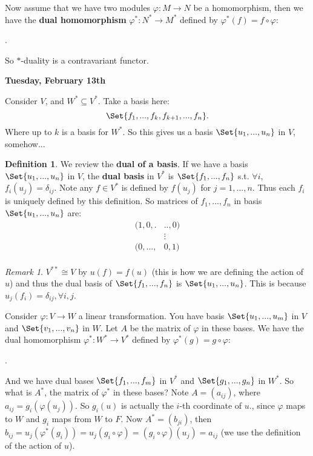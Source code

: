 \documentclass[9pt,reqno,twoside]{amsbook}
\theoremstyle{plain}
\numberwithin{section}{chapter}
\numberwithin{equation}{chapter}
\theoremstyle{definition}
\newtheorem{Def}[theorem]{Definition}
\theoremstyle{remark}
\newtheorem{rem}[theorem]{Remark}
\theoremstyle{plain}
\newcommand{\sub}{\subseteq}
\newcommand{\bb}{\vspace{3mm}}
\newcommand{\bee}{\begin{equation}\begin{aligned}}
\newcommand{\eee}{\end{aligned}\end{equation}}
\renewcommand{\phi}{\varphi}
\begin{document}
Now assume that we have two modules $\phi:M \to N$ be a homomorphism, then we have the \textbf{dual homomorphism} $\phi^*:N^* \to M^*$ defined by $\phi^*(f) = f \circ \phi$:
\begin{center}
.
\end{center}
So $*$-duality is a contravariant functor. 

\bb
\textbf{Tuesday, February 13th}
\bb

Consider $V$, and $W^* \sub V^*$. Take a basis here:
$$
\Set{f_1,...,f_k,f_{k + 1},...,f_n}.
$$
 Where up to $k$ is a basis for $W^*$. So this gives us a basis $\Set{u_1,...,u_n}$ in $V$, somehow... 
 
 \begin{Def}
 We review the \textbf{dual of a basis}. If we have a basis $\Set{u_1,...,u_n}$ in $V$, the \textbf{dual basis} in $V^*$ is $\Set{f_1,...,f_n}$ s.t. $\forall i$, $f_i(u_j) = \delta_{ij}$. Note any $f \in V^*$ is defined by $f(u_j)$ for $j = 1,...,n$. Thus each $f_i$ is uniquely defined by this definition. So matrices of $f_1,...,f_n$ in basis $\Set{u_1,...,u_n}$ are:
 \bee
 (1,0,.&..,0)\\
 &\vdots\\
 (0,...,&0,1)\\
 \eee
 \end{Def}
 


\begin{rem}
$V^{**} \cong V$ by $u(f) = f(u)$ (this is how we are defining the action of $u$) and thus the dual basis of $\Set{f_1,...,f_n}$ is $\Set{u_1,...,u_n}$. This is because $u_j(f_i) = \delta_{ij},\forall i,j$. 
\end{rem}

Consider $\phi:V \to W$ a linear transformation. You have basis $\Set{u_1,...,u_m}$ in $V$ and $\Set{v_1,...,v_n}$ in $W$. Let $A$ be the matrix of $\phi$ in these bases. We have the dual homomorphism $\phi^*:W^* \to V^*$ defined by $\phi^*(g) = g\circ \phi$:

\begin{center}
.
\end{center}
And we have dual bases $\Set{f_1,...,f_m}$ in $V^*$ and $\Set{g_1,...,g_n}$ in $W^*$. So what is $A^*$, the matrix of $\phi^*$ in these bases? Note $A = (a_{ij})$, where $a_{ij} = g_i(\phi(u_j))$. So $g_i(u)$ is actually the $i$-th coordinate of $u$., since $\phi$ maps to $W$ and $g_i$ maps from $W$ to $F$. Now $A^* = (b_{ji})$, then $b_{ij} = u_j(\phi^*(g_i)) = u_j(g_i \circ \phi) = (g_i \circ \phi)(u_j) = a_{ij}$ (we use the definition of the action of $u$). 
\end{document}
